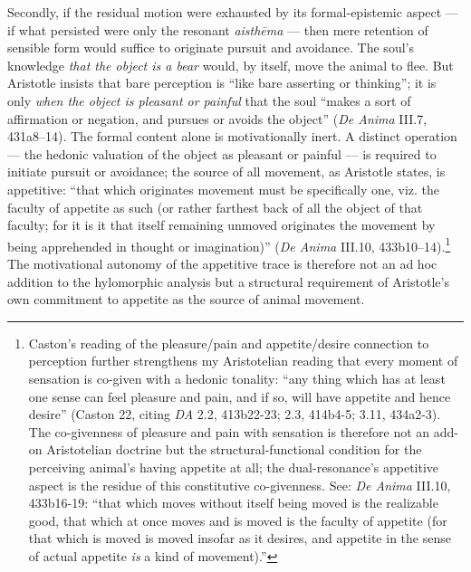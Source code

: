 \documentclass{article}
\begin{document}
Secondly, if the residual motion were exhausted by its formal-epistemic aspect --- if what persisted were only the resonant \textit{aisthēma} --- then mere retention of sensible form would suffice to originate pursuit and avoidance. The soul's knowledge \textit{that the object is a bear} would, by itself, move the animal to flee. But Aristotle insists that bare perception is ``like bare asserting or thinking''; it is only \textit{when the object is pleasant or painful} that the soul ``makes a sort of affirmation or negation, and pursues or avoids the object'' (\textit{De Anima} III.7, 431a8--14). The formal content alone is motivationally inert. A distinct operation --- the hedonic valuation of the object as pleasant or painful --- is required to initiate pursuit or avoidance; the source of all movement, as Aristotle states, is appetitive: ``that which originates movement must be specifically one, viz. the faculty of appetite as such (or rather farthest back of all the object of that faculty; for it is it that itself remaining unmoved originates the movement by being apprehended in thought or imagination)'' (\textit{De Anima} III.10, 433b10--14).\footnote{Caston's reading of the pleasure/pain and appetite/desire connection to perception further strengthens my Aristotelian reading that every moment of sensation is co-given with a hedonic tonality: ``any thing which has at least one sense can feel pleasure and pain, and if so, will have appetite and hence desire'' (Caston 22, citing \textit{DA} 2.2, 413b22-23; 2.3, 414b4-5; 3.11, 434a2-3). The co-givenness of pleasure and pain with sensation is therefore not an add-on Aristotelian doctrine but the structural-functional condition for the perceiving animal's having appetite at all; the dual-resonance's appetitive aspect is the residue of this constitutive co-givenness. See: \textit{De Anima} III.10, 433b16-19: ``that which moves without itself being moved is the realizable good, that which at once moves and is moved is the faculty of appetite (for that which is moved is moved insofar as it desires, and appetite in the sense of actual appetite \textit{is} a kind of movement).''} The motivational autonomy of the appetitive trace is therefore not an ad hoc addition to the hylomorphic analysis but a structural requirement of Aristotle's own commitment to appetite as the source of animal movement.
\end{document}
